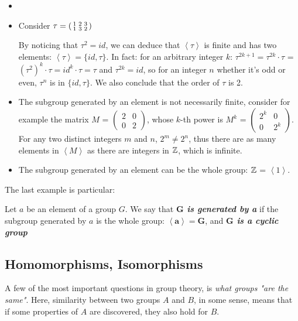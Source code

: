 \begin{example} \label{ex:cyclic-groups}
    \begin{itemize}
        \item[]
    \item Consider $\tau = \begin{psmallmatrix}
        1 & 2 & 3 \\
        1 & 3 & 2 
    \end{psmallmatrix}$

    By noticing that $\tau^2 = id$, we can deduce that $\left\langle \tau \right\rangle$ is finite and has two elements: $\left\langle \tau \right\rangle = \{id, \tau\}$. In fact: for an arbitrary integer $k$: $\tau^{2k + 1} = \tau^{2k} \cdot \tau$ = $(\tau^2)^k\cdot \tau = id^k\cdot\tau = \tau$ and $\tau^{2k} = id$, so for an integer $n$ whether it's odd or even, $\tau^n$ is in $\{id, \tau\}$. We also conclude that the order of $\tau$ is 2.

    \item The subgroup generated by an element is not necessarily finite, consider for example the matrix $M$ = $\begin{pmatrix}
        2  & 0 \\ 
        0 & 2
    \end{pmatrix}$, whose $k$-th power is $M^k$ = $\begin{pmatrix}
    2^k  & 0 \\
    0 & 2^k
    \end{pmatrix}$. For any two distinct integers $m$ and $n$, $2^m \neq 2^n$, thus there are as many elements in $\left\langle M \right\rangle$ as there are integers in $\mathbb{Z}$, which is infinite. 
    \item The subgroup generated by an element can be the whole group: $\mathbb{Z}$ = $\left\langle 1 \right\rangle$.
    
\end{itemize}
\end{example}

The last example is particular:
\begin{boxedDefinition}
    Let $a$ be an element of a group $G$. We say that \textbf{\textit{$\bm{G}$ is generated by a}} if the subgroup generated by $a$ is the whole group: $\bm{\left\langle a \right\rangle = G}$, and \textbf{\textit{$\bm{G}$ is a cyclic group}}
\end{boxedDefinition}


\subsection{Homomorphisms, Isomorphisms}\label{sec:morphisms}
A few of the most important questions in group theory, is \textit{what groups "are the same"}. Here, similarity between two groups $A$ and $B$, in some sense, means that if some properties of $A$ are discovered, they also hold for $B$. 

